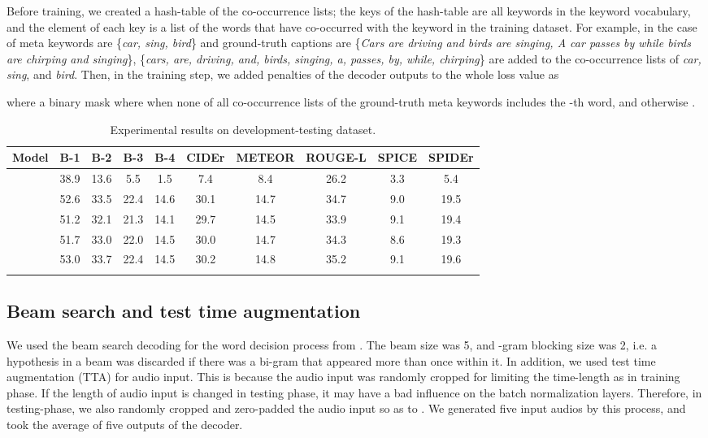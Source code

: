 \documentclass{article}
\begin{document}
\begin{sloppy}
Before training, we created a hash-table of the co-occurrence lists; the keys of the hash-table are all keywords in the keyword vocabulary, and the element of each key is a list of the words that have co-occurred with the keyword in the training dataset.
For example, in the case of meta keywords are \{{\it car, sing, bird}\} and ground-truth captions are \{{\it Cars are driving and birds are singing, A car passes by while birds are chirping and singing}\}, 
\{{\it cars, are, driving, and, birds, singing, a, passes, by, while, chirping}\} are added to the co-occurrence lists of {\it car, sing}, and {\it bird}.
Then, in the training step, we added penalties of the decoder outputs to the whole loss value as

where  a binary mask where  when none of all co-occurrence lists of the ground-truth meta keywords includes the -th word, and otherwise .



\begin{table*}[ttt]
\caption{Experimental results on development-testing dataset.}
\label{tab:result}
\centering
\begin{tabular}{ l | ccccccccc }
\toprule
\textbf{Model} 	& \textbf{B-1}	& \textbf{B-2}	& \textbf{B-3}	& \textbf{B-4}	& \textbf{CIDEr}	& \textbf{METEOR}	& \textbf{ROUGE-L} & \textbf{SPICE} & \textbf{SPIDEr} \\	
\midrule
		& 38.9		& 13.6		& 5.5			& 1.5			& 7.4			& 8.4			& 26.2	& 3.3 	& 5.4 \\
\midrule 
		& 52.6		& 33.5		& 22.4			& 14.6      	& 30.1			& 14.7			& 34.7	& 9.0 	& 19.5 \\
		& 51.2		& 32.1		& 21.3			& 14.1			& 29.7			& 14.5			& 33.9	& 9.1 	& 19.4 \\
		& 51.7		& 33.0		& 22.0			& 14.5			& 30.0			& 14.7			& 34.3	& 8.6 	& 19.3 \\
		& 53.0		& 33.7		& 22.4			& 14.5			& 30.2			& 14.8			& 35.2	& 9.1 	& 19.6 \\
\midrule
		& &&    & 	& 	& 	& 	& 	& 	 \\
\bottomrule
\end{tabular}
\vspace{-5pt}
\end{table*}


\subsection{Beam search and test time augmentation}

We used the beam search decoding for the word decision process from . The beam size was 5, and -gram blocking size was 2, i.e. a hypothesis in a beam was discarded if there was a bi-gram that appeared more than once within it.
In addition, we used test time augmentation (TTA) for audio input.
This is because the audio input was randomly cropped for limiting the time-length as  in training phase.
If the length of audio input is changed in testing phase, it may have a bad influence on the batch normalization layers.
Therefore, in testing-phase, we also randomly cropped and zero-padded the audio input so as to .
We generated five input audios by this process, and took the average of five outputs of the decoder.


\end{sloppy}
\end{document}

